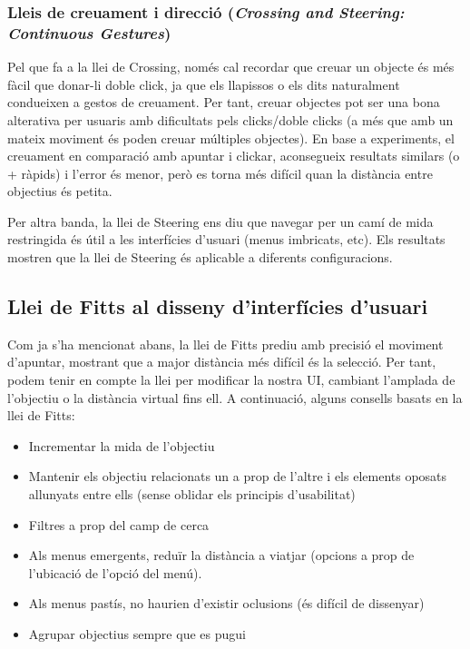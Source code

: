 \documentclass[12pt]{article}
\begin{document}
    \subsubsection{Lleis de creuament i direcció (\textit{Crossing and Steering: Continuous Gestures})}
    Pel que fa a la llei de Crossing, només cal recordar que creuar un objecte és més fàcil que donar-li doble click, ja que els llapissos
    o els dits naturalment condueixen a gestos de creuament. Per tant, creuar objectes pot ser una bona alterativa per usuaris amb dificultats
    pels clicks/doble clicks (a més que amb un mateix moviment és poden creuar múltiples objectes). En base a experiments, el creuament en comparació amb
    apuntar i clickar, aconsegueix resultats similars (o + ràpids) i l'error és menor, però es torna més difícil quan la distància entre objectius és petita.
    
    \hfill \break
    Per altra banda, la llei de Steering ens diu que navegar per un camí de mida restringida és útil a les interfícies d'usuari (menus imbricats, etc). Els resultats
    mostren que la llei de Steering és aplicable a diferents configuracions.

    \newpage
    \subsection{Llei de Fitts al disseny d'interfícies d'usuari}
    Com ja s'ha mencionat abans, la llei de Fitts prediu amb precisió el moviment d'apuntar, mostrant que a major distància més difícil és la selecció.
    Per tant, podem tenir en compte la llei per modificar la nostra UI, cambiant l'amplada de l'objectiu o la distància virtual fins ell. A continuació, alguns
    consells basats en la llei de Fitts:

    \begin{itemize}
        \item Incrementar la mida de l'objectiu
        \item Mantenir els objectiu relacionats un a prop de l'altre i els elements oposats allunyats entre ells (sense oblidar els principis d'usabilitat)
        \item Filtres a prop del camp de cerca
        \item Als menus emergents, reduïr la distància a viatjar (opcions a prop de l'ubicació de l'opció del menú).
        \item Als menus pastís, no haurien d'existir oclusions (és difícil de dissenyar)
        \item Agrupar objectius sempre que es pugui
    \end{itemize}
\end{document}
